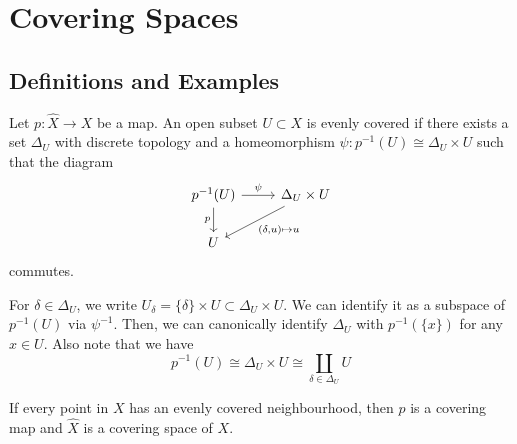 \section{Covering Spaces}
\subsection{Definitions and Examples}
\begin{definition}
    Let $p:\hat{X}\to X$ be a map.
    An open subset $U\subset X$ is evenly covered if there exists a set $\Delta_U$ with discrete topology and a homeomorphism $\psi:p^{-1}(U)\cong\Delta_U\times U$ such that the diagram
    \[
        \begin{tikzcd}
            p^{-1}(U)\arrow{r}{\psi}\arrow[swap]{d}{p}&\Delta_U\times U\arrow{dl}{(\delta,u)\mapsto u}\\
            U&
        \end{tikzcd}
    \]
    commutes.
\end{definition}
For $\delta\in\Delta_U$, we write $U_\delta=\{\delta\}\times U\subset\Delta_U\times U$.
We can identify it as a subspace of $p^{-1}(U)$ via $\psi^{-1}$.
Then, we can canonically identify $\Delta_U$ with $p^{-1}(\{x\})$ for any $x\in U$.
Also note that we have
$$p^{-1}(U)\cong\Delta_U\times U\cong\coprod_{\delta\in\Delta_U}U$$
\begin{definition}
    If every point in $X$ has an evenly covered neighbourhood, then $p$ is a covering map and $\hat{X}$ is a covering space of $X$.
\end{definition}
